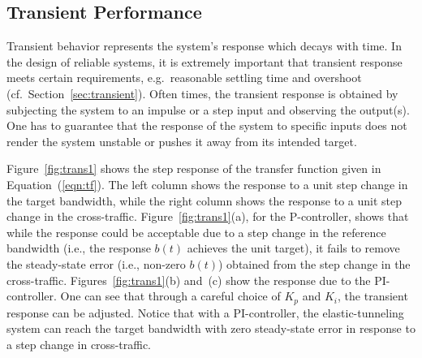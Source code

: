 \documentclass{article}
\begin{document}
\subsection{Transient Performance}
Transient behavior represents the system's response 
which decays with
time. 
In the design of reliable systems,
it is extremely important 
that transient response meets certain requirements, 
e.g.\ reasonable settling time and overshoot (cf.\ Section~\ref{sec:transient}). 
Often times, the transient response is
obtained by subjecting the system to an impulse or a step input and
observing the output(s).
One has to guarantee that the response of the
system to specific inputs does not render the system
unstable or pushes it away from its intended target.

Figure~\ref{fig:trans1} shows
 the step response of the
transfer function given in
Equation~(\ref{eqn:tf}).
The left column 
shows  the response to a unit step change
in the target bandwidth, while the right column 
shows the
response to a unit step change in the cross-traffic. 
Figure~\ref{fig:trans1}(a),
for the P-controller,
shows that while the response could be acceptable due to
a step change in the reference bandwidth (i.e., the response $b(t)$ achieves the unit target), 
it fails to remove the steady-state
error (i.e., non-zero $b(t)$) obtained from the step change in the cross-traffic. 
Figures~\ref{fig:trans1}(b) and~(c)
show the response due to the PI-controller. 
One can
see that through a careful choice of $K_p$ and $K_i$, the transient
response can be adjusted.  
Notice that with a PI-controller,
the elastic-tunneling system can reach the target bandwidth with
zero steady-state error in response to a step change
in cross-traffic.
\end{document}
